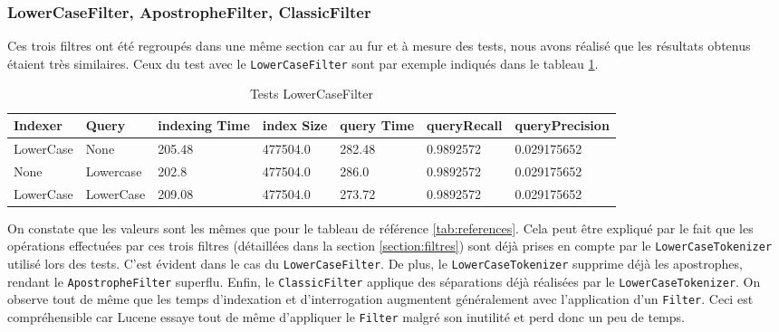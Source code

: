 \subsubsection{LowerCaseFilter, ApostropheFilter, ClassicFilter}
\label{section:filtrespourris}

Ces trois filtres ont été regroupés dans une même section car au fur et à mesure des tests, nous avons réalisé que les résultats obtenus étaient très similaires. Ceux du test avec le \texttt{LowerCaseFilter} sont par exemple indiqués dans le tableau \ref{tab:tests_LowerCaseFilter}.

\begin{table}[!htbp]
    \hspace{-2cm}
                \begin{tabular}{|p{2cm}|p{2cm}|p{2cm}|p{2cm}|p{2.5cm}|p{2.5cm}|p{2.5cm}|}
                    \hline
                    \textbf{Indexer} & \textbf{Query} & \textbf{indexing Time} & \textbf{index Size} & \textbf{query Time} & \textbf{queryRecall} & \textbf{queryPrecision}\\
                    \hline
LowerCase & None & 205.48 & 477504.0 & 282.48 & 0.9892572 & 0.029175652\\
		\hline
None & Lowercase & 202.8 & 477504.0 & 286.0 & 0.9892572 & 0.029175652\\
		\hline
LowerCase & LowerCase & 209.08 & 477504.0 & 273.72 & 0.9892572 & 0.029175652\\
                    \hline
                \end{tabular}
                \caption{Tests LowerCaseFilter}
                \label{tab:tests_LowerCaseFilter}
            \end{table}

On constate que les valeurs sont les mêmes que pour le tableau de référence \ref{tab:references}. Cela peut être expliqué par le fait que les opérations effectuées par ces trois filtres (détaillées dans la section \ref{section:filtres}) sont déjà prises en compte par le \texttt{LowerCaseTokenizer} utilisé lors des tests. C’est évident dans le cas du \texttt{LowerCaseFilter}. De plus, le \texttt{LowerCaseTokenizer} supprime déjà les apostrophes, rendant le \texttt{ApostropheFilter} superflu. Enfin, le \texttt{ClassicFilter} applique des séparations déjà réalisées par le \texttt{LowerCaseTokenizer}. On observe tout de même que les temps d’indexation et d’interrogation augmentent généralement  avec l’application d’un \texttt{Filter}. Ceci est compréhensible car Lucene essaye tout de même d’appliquer le \texttt{Filter} malgré son inutilité et perd donc un peu de temps.

